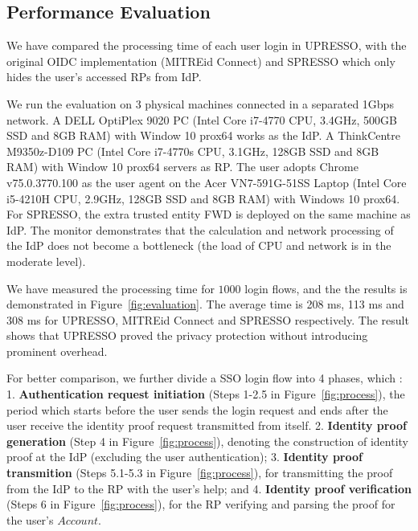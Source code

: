 \subsection{Performance Evaluation}
\label{sec:evaluation}
We have compared the processing time of each user login in UPRESSO, with the original OIDC implementation (MITREid Connect) and SPRESSO which only hides the user's accessed RPs from IdP.

We run the evaluation on 3 physical machines connected in a separated 1Gbps network. A DELL OptiPlex 9020 PC (Intel Core i7-4770 CPU, 3.4GHz, 500GB SSD and 8GB RAM) with Window 10 prox64 works as the IdP. A ThinkCentre M9350z-D109 PC (Intel Core i7-4770s CPU, 3.1GHz, 128GB SSD and 8GB RAM) with  Window 10 prox64 servers as RP. The user adopts Chrome v75.0.3770.100 as the user agent on the Acer VN7-591G-51SS Laptop (Intel Core i5-4210H CPU, 2.9GHz, 128GB SSD and 8GB RAM) with  Windows 10 prox64. For SPRESSO, the extra trusted entity FWD is deployed on the same machine as IdP. 
The monitor demonstrates that the calculation and network processing of the IdP does not become a bottleneck (the load of CPU and network is in the moderate level).

We have measured the processing time for $1000$ login flows, and the the results is demonstrated in Figure~\ref{fig:evaluation}. The average time is 208 ms, 113 ms and 308 ms for UPRESSO, MITREid Connect and SPRESSO respectively. The result shows that UPRESSO proved the privacy protection without introducing prominent overhead.


For better comparison, we further divide a SSO login flow into 4 phases, which : 1. \textbf{Authentication request initiation} (Steps 1-2.5 in Figure~\ref{fig:process}), the period which starts before the user sends the login request and ends after the user receive the identity proof request transmitted from itself.
2. \textbf{Identity proof generation} (Step 4 in Figure~\ref{fig:process}), denoting the construction of identity proof at the IdP (excluding the user authentication); 3. \textbf{Identity proof transmition} (Steps 5.1-5.3 in Figure~\ref{fig:process}), for transmitting the proof from the IdP to the RP with the user's help; and 4. \textbf{Identity proof verification} (Steps 6 in Figure~\ref{fig:process}), for the RP  verifying and parsing the proof for the user's $Account$. 



